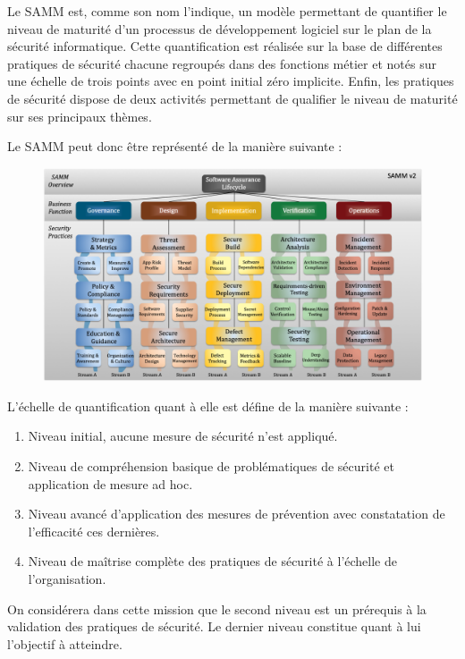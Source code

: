 Le \ac{SAMM} est, comme son nom l'indique, un modèle permettant de quantifier le niveau de maturité d'un processus de 
développement logiciel sur le plan de la sécurité informatique. Cette quantification est réalisée sur la base de 
différentes pratiques de sécurité chacune regroupés dans des fonctions métier et notés sur une échelle de trois points 
avec en point initial zéro implicite. Enfin, les pratiques de sécurité dispose de deux activités permettant de qualifier
le niveau de maturité sur ses principaux thèmes.

Le \ac{SAMM} peut donc être représenté de la manière suivante :

\begin{figure}[h]
    \centering
    \includegraphics[width=1\linewidth]{resources/img/Samm_v2.png}
    \label{fig:samm-rep}
\end{figure}

\newpage

L'échelle de quantification quant à elle est défine de la manière suivante : 
\begin{enumerate}
    \item Niveau initial, aucune mesure de sécurité n'est appliqué.
    \item Niveau de compréhension basique de problématiques de sécurité et application de mesure ad hoc.
    \item Niveau avancé d'application des mesures de prévention avec constatation de l'efficacité ces dernières.
    \item Niveau de maîtrise complète des pratiques de sécurité à l'échelle de l'organisation.
\end{enumerate}
On considérera dans cette mission que le second niveau est un prérequis à la validation des pratiques de sécurité.
Le dernier niveau constitue quant à lui l'objectif à atteindre.

